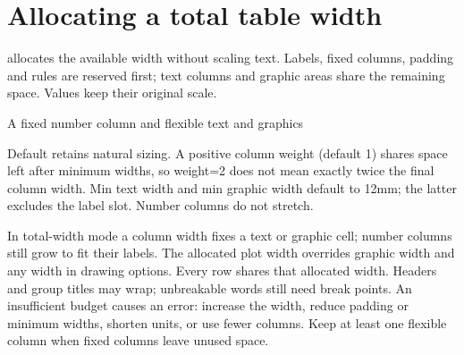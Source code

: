 \section{Allocating a total table width}
 allocates the available width without scaling text.
Labels, fixed columns, padding and rules are reserved first; text columns and
graphic areas share the remaining space. Values keep their original scale.
\begin{demo}{A fixed number column and flexible text and graphics}
\begin{center}
\begin{gradtable}[align=c,header align=c,width=\linewidth,label width=12mm,column sep=6pt,row padding=2pt,
  min text width=18mm,min graphic width=15mm]
\end{gradtable}
\end{center}
\end{demo}
Default  retains natural sizing. A positive column weight (default 1)
shares space left after minimum widths, so weight=2 does not mean exactly twice
the final column width. Min text width and min graphic width default to 12mm;
the latter excludes the label slot. Number columns do not stretch.

In total-width mode a column width fixes a text or graphic cell; number columns
still grow to fit their labels. The allocated plot width overrides graphic width
and any width in drawing options. Every row shares that allocated width.
Headers and group titles may wrap; unbreakable words still need break points.
An insufficient budget causes an error: increase the width, reduce padding or
minimum widths, shorten units, or use fewer columns. Keep at least one flexible
column when fixed columns leave unused space.
